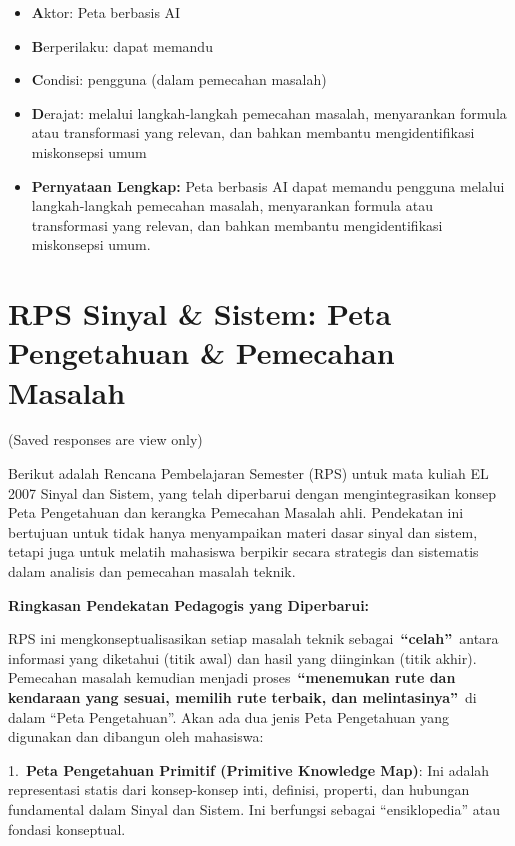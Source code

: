 \documentclass[
  letterpaper,
  DIV=11,
  numbers=noendperiod]{scrreprt}
\begin{document}
\begin{enumerate}
  \begin{itemize}
  \item
    \textbf{A}ktor: Peta berbasis AI
  \item
    \textbf{B}erperilaku: dapat memandu
  \item
    \textbf{C}ondisi: pengguna (dalam pemecahan masalah)
  \item
    \textbf{D}erajat: melalui langkah-langkah pemecahan masalah,
    menyarankan formula atau transformasi yang relevan, dan bahkan
    membantu mengidentifikasi miskonsepsi umum
  \item
    \textbf{Pernyataan Lengkap:} Peta berbasis AI dapat memandu pengguna
    melalui langkah-langkah pemecahan masalah, menyarankan formula atau
    transformasi yang relevan, dan bahkan membantu mengidentifikasi
    miskonsepsi umum.
  \end{itemize}
\end{enumerate}


\chapter{RPS Sinyal \& Sistem: Peta Pengetahuan \& Pemecahan
Masalah}\label{rps-sinyal-sistem-peta-pengetahuan-pemecahan-masalah}

(Saved responses are view only)

Berikut adalah Rencana Pembelajaran Semester (RPS) untuk mata kuliah EL
2007 Sinyal dan Sistem, yang telah diperbarui dengan mengintegrasikan
konsep Peta Pengetahuan dan kerangka Pemecahan Masalah ahli. Pendekatan
ini bertujuan untuk tidak hanya menyampaikan materi dasar sinyal dan
sistem, tetapi juga untuk melatih mahasiswa berpikir secara strategis
dan sistematis dalam analisis dan pemecahan masalah teknik.

\textbf{Ringkasan Pendekatan Pedagogis yang Diperbarui:}

RPS ini mengkonseptualisasikan setiap masalah teknik
sebagai~\textbf{``celah''}~antara informasi yang diketahui (titik awal)
dan hasil yang diinginkan (titik akhir). Pemecahan masalah kemudian
menjadi proses~\textbf{``menemukan rute dan kendaraan yang sesuai,
memilih rute terbaik, dan melintasinya''}~di dalam ``Peta Pengetahuan''.
Akan ada dua jenis Peta Pengetahuan yang digunakan dan dibangun oleh
mahasiswa:

1.~\textbf{Peta Pengetahuan Primitif (Primitive Knowledge Map)}: Ini
adalah representasi statis dari konsep-konsep inti, definisi, properti,
dan hubungan fundamental dalam Sinyal dan Sistem. Ini berfungsi sebagai
``ensiklopedia'' atau fondasi konseptual.
\end{document}
